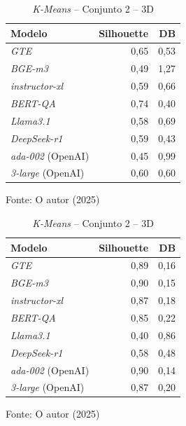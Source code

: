 \begin{table}[H]
    \centering
    \begin{minipage}{0.48\textwidth}
        \caption{\textit{K-Means} -- Conjunto 1 -- 3D}
        \centering
        \begin{tabular}{ l r r }
            \hline
            \textbf{Modelo} & \textbf{Silhouette} & \textbf{DB} \\  
            \hline
            \textit{GTE} & 0,65 & 0,53 \\
            \textit{BGE-m3} & 0,49 & 1,27 \\
            \textit{instructor-xl} & 0,59 & 0,66 \\
            \textit{BERT-QA} & 0,74 & 0,40 \\
            \textit{Llama3.1} & 0,58 & 0,69 \\
            \textit{DeepSeek-r1} & 0,59 & 0,43 \\
            \textit{ada-002} (OpenAI) & 0,45 & 0,99 \\
            \textit{3-large} (OpenAI) & 0,60 & 0,60 \\
            \hline
        \end{tabular}
        \vspace{2mm}
        \small Fonte: O autor (2025)
        \label{tab:kmeans-conjunto-documentos1-com-reducao}
    \end{minipage}
    \hfill
    \begin{minipage}{0.48\textwidth}
        \caption{\textit{K-Means} -- Conjunto 2 -- 3D}
        \centering
        \begin{tabular}{ l r r }
            \hline
            \textbf{Modelo} & \textbf{Silhouette} & \textbf{DB} \\  
            \hline
            \textit{GTE} & 0,89 & 0,16 \\
            \textit{BGE-m3} & 0,90 & 0,15 \\
            \textit{instructor-xl} & 0,87 & 0,18 \\
            \textit{BERT-QA} & 0,85 & 0,22 \\
            \textit{Llama3.1} & 0,40 & 0,86 \\
            \textit{DeepSeek-r1} & 0,58 & 0,48 \\
            \textit{ada-002} (OpenAI) & 0,90 & 0,14 \\
            \textit{3-large} (OpenAI) & 0,87 & 0,20 \\
            \hline
        \end{tabular}
        \vspace{2mm}
        \small Fonte: O autor (2025)
        \label{tab:kmeans-conjunto-documentos2-com-reducao}
    \end{minipage}


\end{table}
